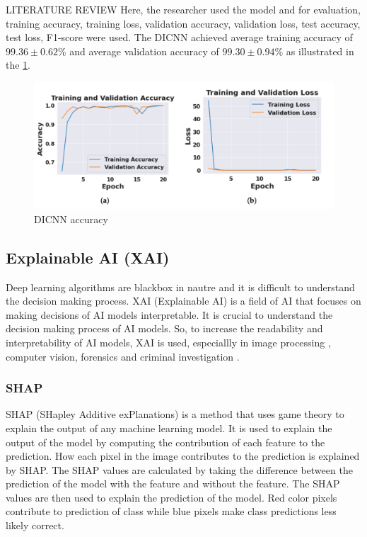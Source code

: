 \begin{section}[]{\uppercase{Literature Review}}
\noindent Here, the researcher used the model and for evaluation, training accuracy, training loss, validation accuracy, validation loss, test accuracy, test loss, F1-score were used. The DICNN achieved average training accuracy of \(99.36 \pm 0.62\%\) and average validation accuracy of \(99.30 \pm 0.94\%\) as illustrated in the \ref{fig:dicnn-accuracy}.

\begin{figure}[htbp]
    \centering
    \includegraphics[width=\linewidth]{images/dicnn-accuracy.png}
    \caption{DICNN accuracy}
    \label{fig:dicnn-accuracy}
\end{figure}

\subsection{Explainable AI (XAI)}
Deep learning algorithms are blackbox in nautre and it is difficult to understand the decision making process. XAI (Explainable AI) is a field of AI that focuses on making decisions of AI models interpretable. It is crucial to understand the decision making process of AI models. So, to increase the readability and interpretability of AI models, XAI is used, especiallly in image processing \cite{Bhandari2022}, computer vision, forensics \cite{Hall2022} and criminal investigation \cite{BachmaierWinter2022}.

\subsubsection{SHAP}
SHAP (SHapley Additive exPlanations) is a method that uses game theory to explain the output of any machine learning model. It is used to explain the output of the model by computing the contribution of each feature to the prediction. \cite{SHAP}
How each pixel in the image contributes to the prediction is explained by SHAP. The SHAP values are calculated by taking the difference between the prediction of the model with the feature and without the feature. The SHAP values are then used to explain the prediction of the model.
Red color pixels contribute to prediction of class while blue pixels make class predictions less likely correct. \cite{Lundberg2017}


\end{section}
